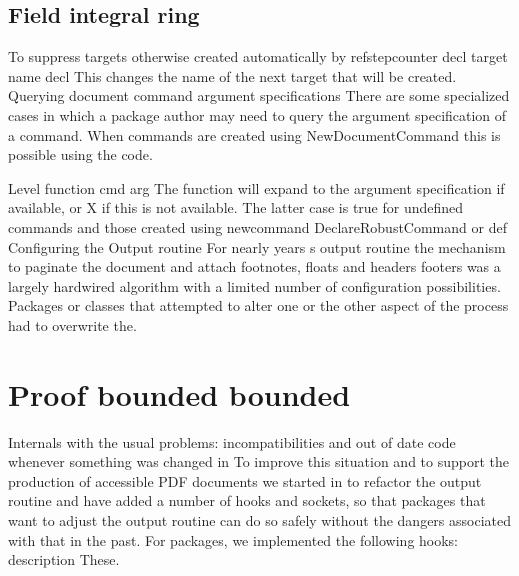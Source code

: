 \documentclass{article}
\begin{document}
\subsection{Field integral ring}
To suppress targets otherwise created automatically by refstepcounter decl target name decl This changes the name of the next target that will be created. Querying document command argument specifications There are some specialized cases in which a package author may need to query the argument specification of a command. When commands are created using NewDocumentCommand this is possible using the code.

Level function cmd arg The function will expand to the argument specification if available, or X if this is not available. The latter case is true for undefined commands and those created using newcommand DeclareRobustCommand or def Configuring the Output routine For nearly years s output routine the mechanism to paginate the document and attach footnotes, floats and headers footers was a largely hardwired algorithm with a limited number of configuration possibilities. Packages or classes that attempted to alter one or the other aspect of the process had to overwrite the.

\section{Proof bounded bounded}\label{sec10}
Internals with the usual problems: incompatibilities and out of date code whenever something was changed in To improve this situation and to support the production of accessible PDF documents we started in to refactor the output routine and have added a number of hooks and sockets, so that packages that want to adjust the output routine can do so safely without the dangers associated with that in the past. For packages, we implemented the following hooks: description These.
\end{document}
